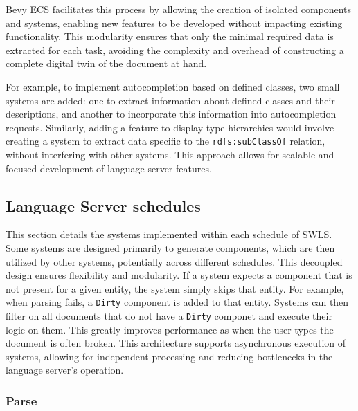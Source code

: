 Bevy ECS facilitates this process by allowing the creation of isolated components and systems, enabling new features to be developed without impacting existing functionality.
This modularity ensures that only the minimal required data is extracted for each task, avoiding the complexity and overhead of constructing a complete digital twin of the document at hand.

For example, to implement autocompletion based on defined classes, two small systems are added:
  one to extract information about defined classes and their descriptions,
  and another to incorporate this information into autocompletion requests. 
Similarly, adding a feature to display type hierarchies would involve creating a system to extract data specific to the \texttt{rdfs:subClassOf} relation, without interfering with other systems.
This approach allows for scalable and focused development of language server features.


\subsection{Language Server schedules}

This section details the systems implemented within each schedule of SWLS.
Some systems are designed primarily to generate components, which are then utilized by other systems, potentially across different schedules.
This decoupled design ensures flexibility and modularity. 
If a system expects a component that is not present for a given entity, the system simply skips that entity.
For example, when parsing fails, a \texttt{Dirty} component is added to that entity.
Systems can then filter on all documents that do not have a \texttt{Dirty} componet and execute their logic on them.
This greatly improves performance as when the user types the document is often broken.
This architecture supports asynchronous execution of systems, allowing for independent processing and reducing bottlenecks in the language server’s operation.

\subsubsection{Parse}


